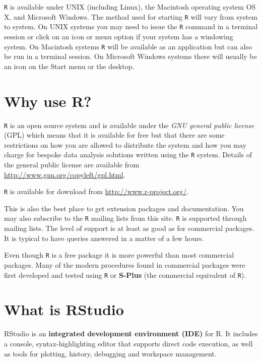 \documentclass[
  12pt,
]{book}
\begin{document}
\texttt{R} is available under UNIX (including Linux), the Macintosh operating system OS X, and Microsoft Windows. The method used for starting \texttt{R} will vary from system to system. On UNIX systems you may need to issue the \texttt{R} command in a terminal session or click on an icon or menu option if your system has a windowing system. On Macintosh systems \texttt{R} will be available as an application but can also be run in a terminal session. On Microsoft Windows systems there will usually be an icon on the Start menu or the desktop.

\hypertarget{why-r}{%
\section{Why use R?}\label{why-r}}

\texttt{R} is an open source system and is available under the \emph{GNU general public license} (GPL) which means that it is available for free but that there are some restrictions on how you are allowed to distribute the system and how you may charge for bespoke data analysis solutions written using the \texttt{R} system. Details of the general public license are available from \url{http://www.gnu.org/copyleft/gpl.html}.

\texttt{R} is available for download from \url{http://www.r-project.org/}.

This is also the best place to get extension packages and documentation. You may also subscribe to the \texttt{R} mailing lists from this site. \texttt{R} is supported through mailing lists. The level of support is at least as good as for commercial packages. It is typical to have queries answered in a matter of a few hours.

Even though \texttt{R} is a free package it is more powerful than most commercial packages. Many of the modern procedures found in commercial packages were first developed and tested using \texttt{R} or \textbf{S-Plus} (the commercial equivalent of \texttt{R}).

\hypertarget{what-rstudio}{%
\section{What is RStudio}\label{what-rstudio}}

RStudio is an \textbf{integrated development environment (IDE)} for R. It includes a console, syntax-highlighting editor that supports direct code execution, as well as tools for plotting, history, debugging and workspace management.
\end{document}
